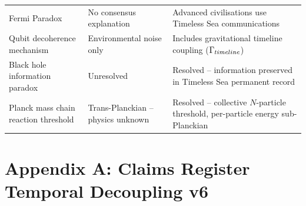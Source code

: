 \documentclass[11pt,a4paper]{article}
\let\text\relax \let\mathrm\relax \let\mathbf\relax \let\mathcal\relax
\begin{document}
\begin{center}
\begin{tabular}{p{3.5cm} p{4.5cm} p{5.5cm}}
Fermi Paradox & No consensus explanation & Advanced civilisations use Timeless Sea communications \\
Qubit decoherence mechanism & Environmental noise only & Includes gravitational timeline coupling ($\Gamma_{\text{timeline}}$) \\
Black hole information paradox & Unresolved & Resolved -- information preserved in Timeless Sea permanent record \\
Planck mass chain reaction threshold & Trans-Planckian -- physics unknown & Resolved -- collective $N$-particle threshold, per-particle energy sub-Planckian \\
\bottomrule
\end{tabular}
\end{center}

\section*{Appendix A: Claims Register \textperiodcentered Temporal Decoupling v6}
\setlength{\LTpre}{6pt}
\setlength{\LTpost}{6pt}
\setlength{\LTcapwidth}{\textwidth}
\setlength{\tabcolsep}{3.2pt}
\renewcommand{\arraystretch}{1.12}
\small
\end{document}
